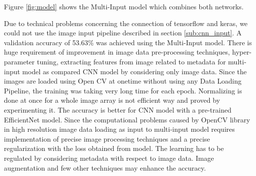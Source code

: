 Figure \ref{fig:model} shows the Multi-Input model which combines both networks. 

Due to technical problems concerning the connection of tensorflow and keras, we could not use the image input pipeline described in section \ref{sub:cnn_input}. 
A validation accuracy of 53.63\% was achieved using the Multi-Input model. There is huge requirement of improvement in image data pre-processing techniques, hyper-parameter tuning, extracting features from image related to metadata for multi-input model as compared CNN model by considering only image data. Since the images are loaded using Open CV at onetime without using any Data Loading Pipeline, the training was taking very long time for each epoch. Normalizing is done at once for a whole image array is not efficient way and proved by experimenting it.
The accuracy is better for CNN model with a pre-trained EfficientNet model. Since the computational problems caused by OpenCV library in high resolution image data loading as input to multi-input model requires implementation of precise image processing techniques and a precise regularization with the loss obtained from model. The learning has to be regulated by considering metadata with respect to image data. Image augmentation and few other techniques may enhance the accuracy.  
